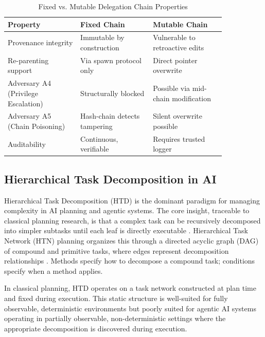 \begin{table}[h]
\centering
\caption{Fixed vs. Mutable Delegation Chain Properties}
\label{tab:delegation-comparison}
\begin{tabular}{p{0.28\linewidth} p{0.28\linewidth} p{0.28\linewidth}}
\toprule
\textbf{Property} & \textbf{Fixed Chain} & \textbf{Mutable Chain} \\
\midrule
Provenance integrity & Immutable by construction & Vulnerable to retroactive edits \\
Re-parenting support & Via spawn protocol only & Direct pointer overwrite \\
Adversary A4 (Privilege Escalation) & Structurally blocked & Possible via mid-chain modification \\
Adversary A5 (Chain Poisoning) & Hash-chain detects tampering & Silent overwrite possible \\
Auditability & Continuous, verifiable & Requires trusted logger \\
\bottomrule
\end{tabular}
\end{table}

\subsection{Hierarchical Task Decomposition in AI}
\label{sec:task-decomp}

Hierarchical Task Decomposition (HTD) is the dominant paradigm for managing complexity in AI planning and agentic systems. The core insight, traceable to classical planning research, is that a complex task can be recursively decomposed into simpler subtasks until each leaf is directly executable \cite{nilsson1982principles}. Hierarchical Task Network (HTN) planning organizes this through a directed acyclic graph (DAG) of compound and primitive tasks, where edges represent decomposition relationships \cite{ghallab2004htn}. Methods specify how to decompose a compound task; conditions specify when a method applies.

In classical planning, HTD operates on a task network constructed at plan time and fixed during execution. This static structure is well-suited for fully observable, deterministic environments but poorly suited for agentic AI systems operating in partially observable, non-deterministic settings where the appropriate decomposition is discovered during execution.

